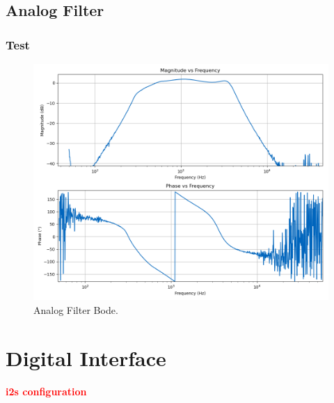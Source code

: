 \subsection{Analog Filter}

\subsubsection{Test}

\begin{figure}[H]
    \centering
    \includegraphics*[scale = 0.5]{Images/AnalogFilterScoppyBode.png}
    \caption{Analog Filter Bode.}
    \label{fig:AnalogFilterBodeScoppy}
\end{figure}

\section{Digital Interface}

\textcolor{red}{\textbf{i2s configuration}}
